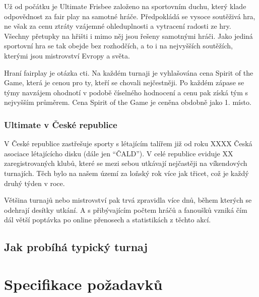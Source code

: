 \documentclass[thesis=B,czech]{FITthesis}[2012/06/26]
\begin{document}
Už od počátku je Ultimate Frisbee založeno na sportovním duchu, který klade odpovědnost
za fair play na samotné hráče. Předpokládá se vysoce soutěživá hra, ne však za cenu ztráty
vzájemné ohleduplnosti a vytracení radosti ze hry. Všechny přetupky na hřišti i mimo něj jsou
řešeny samotnými hráči. Jako jediná sportovní hra se tak obejde bez rozhodčích, a to i
na nejvyšších soutěžích, kterými jsou mistrovství Evropy a světa.

\medskip

Hraní fairplay je otázka cti. Na každém turnaji je vyhlašována cena Spirit of the Game,
která je cenou pro ty, kteří se chovali nejčestněji. Po každém zápase se týmy navzájem ohodnotí
v podobě číselného hodnocení a cenu pak získá tým s nejvyšším průměrem. Cena Spirit of the Game
je ceněna obdobně jako 1. místo.

\subsection{Ultimate v České republice}

\indent

V České republice zastřešuje sporty s létajícím talířem již od roku XXXX Česká asociace
lé\-ta\-jícícho disku (dále jen ``ČALD''). V celé republice eviduje XX zaregistrovaných klubů,
které se mezi sebou utkávají nejčastěji na víkendových turnajích. Těch bylo na našem
území za loňský rok více jak třicet, což je každý druhý týden v roce.

\medskip

Většina turnajů nebo mistrovství pak trvá zpravidla více dnů, během kterých se odehrají desítky
utkání. A s přibývajícím počtem hráčů a fanoušků vzniká čím dál větší poptávka po online přenosech
a statistikách z těchto akcí.


\section{Jak probíhá typický turnaj}


\chapter{Specifikace požadavků}
\end{document}
